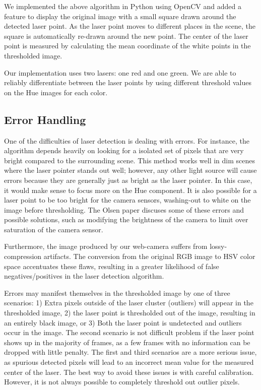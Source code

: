 \documentclass[10pt,twocolumn,letterpaper]{article}
\begin{document}
We implemented the above algorithm in Python using OpenCV and added a feature to display the original image with a small square drawn around the detected laser point.  As the laser point moves to different places in the scene, the square is automatically re-drawn around the new point.  The center of the laser point is measured by calculating the mean coordinate of the white points in the thresholded image.

Our implementation uses two lasers: one red and one green.  We are able to reliably differentiate between the laser points by using different threshold values on the Hue images for each color.

\subsection{Error Handling}

One of the difficulties of laser detection is dealing with errors. For instance, the algorithm depends heavily on looking for a isolated set of pixels that are very bright compared to the surrounding scene. This method works well in dim scenes where the laser pointer stands out well; however, any other light source will cause errors because they are generally just as bright as the laser pointer. In this case, it would make sense to focus more on the Hue component. It is also possible for a laser point to be too bright for the camera sensors, washing-out to white on the image before thresholding. The Olsen paper \cite{olsen01laser} discuses some of these errors and possible solutions, such as modifying the brightness of the camera to limit over saturation of the camera sensor.

Furthermore, the image produced by our web-camera suffers from lossy-compression artifacts.  The conversion from the original RGB image to HSV color space accentuates these flaws, resulting in a greater likelihood of false negatives/positives in the laser detection algorithm.

Errors may manifest themselves in the thresholded image by one of three scenarios: 1) Extra pixels outside of the laser cluster (outliers) will appear in the thresholded image, 2) the laser point is thresholded out of the image, resulting in an entirely black image, or 3) Both the laser point is undetected and outliers occur in the image.  The second scenario is not difficult problem if the laser point shows up in the majority of frames, as a few frames with no information can be dropped with little penalty.  The first and third scenarios are a more serious issue, as spurious detected pixels will lead to an incorrect mean value for the measured center of the laser.  The best way to avoid these issues is with careful calibration.  However, it is not always possible to completely threshold out outlier pixels.
\end{document}
